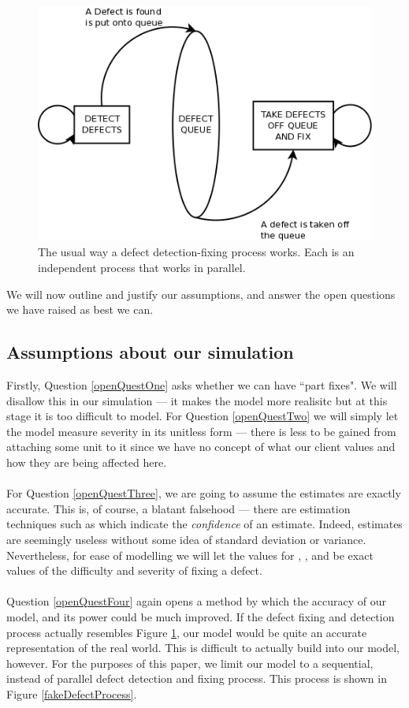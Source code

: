 \begin{figure}[ht!]
  \centering
	\includegraphics[scale=0.5]{Blah.png}
	\caption{The usual way a defect detection-fixing process works.
  Each is an independent process that works in parallel.} \label{realDefectProcess}
\end{figure}

We will now outline and justify our assumptions, and answer the open questions we have raised as
best we can.

\subsection{Assumptions about our simulation}

Firstly, Question \ref{openQuestOne} asks whether we can have ``part fixes".
We will disallow this in our simulation --- it makes the model more realisitc but at this stage it
is too difficult to model.
For Question \ref{openQuestTwo} we will simply let the model measure severity in its
unitless form --- there is less to be gained from attaching some unit to it since we have no concept
of what our client values and how they are being affected here.\\
\\
For Question \ref{openQuestThree}, we are going to assume the estimates are exactly accurate.
This is, of course, a blatant falsehood --- there are estimation techniques such
as \cite{pulford1996overconfidence} which
indicate the {\em confidence} of an estimate.
Indeed, estimates are seemingly useless without some idea of standard deviation or variance.
Nevertheless, for ease of modelling we will let the values for \easy, \hard, \minor and \major be
exact values of the difficulty and severity of fixing a defect.\\
\\
Question \ref{openQuestFour} again opens a method by which the accuracy of our model, and its power
could be much improved.
If the defect fixing and detection process actually resembles Figure \ref{realDefectProcess}, our
model would be quite an accurate representation of the real world.
This is difficult to actually build into our model, however.
For the purposes of this paper, we limit our model to a sequential, instead of parallel defect
detection and fixing process.
This process is shown in Figure \ref{fakeDefectProcess}.

